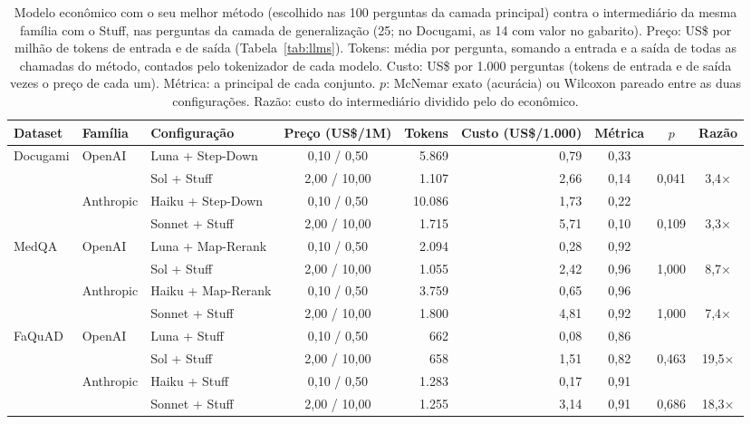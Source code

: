 \begin{table}[!t]
\centering
\footnotesize
\setlength{\tabcolsep}{4pt}
\caption{Modelo econômico com o seu melhor método (escolhido nas 100 perguntas da camada principal) contra o intermediário da mesma família com o Stuff, nas perguntas da camada de generalização (25; no Docugami, as 14 com valor no gabarito). Preço: US\$ por milhão de tokens de entrada e de saída (Tabela~\ref{tab:llms}). Tokens: média por pergunta, somando a entrada e a saída de todas as chamadas do método, contados pelo tokenizador de cada modelo. Custo: US\$ por 1.000 perguntas (tokens de entrada e de saída vezes o preço de cada um). Métrica: a principal de cada conjunto. $p$: McNemar exato (acurácia) ou Wilcoxon pareado entre as duas configurações. Razão: custo do intermediário dividido pelo do econômico.}
\label{tab:porte}
\begin{tabular}{lllcrrccc}
\toprule
Dataset & Família & Configuração & Preço (US\$/1M) & Tokens & Custo (US\$/1.000) & Métrica & $p$ & Razão \\
\midrule
Docugami & OpenAI & Luna + Step-Down & 0,10 / 0,50 & 5.869 & 0,79 & 0,33 &  &  \\
 &  & Sol + Stuff & 2,00 / 10,00 & 1.107 & 2,66 & 0,14 & 0,041 & 3,4× \\
\addlinespace
 & Anthropic & Haiku + Step-Down & 0,10 / 0,50 & 10.086 & 1,73 & 0,22 &  &  \\
 &  & Sonnet + Stuff & 2,00 / 10,00 & 1.715 & 5,71 & 0,10 & 0,109 & 3,3× \\
\midrule
MedQA & OpenAI & Luna + Map-Rerank & 0,10 / 0,50 & 2.094 & 0,28 & 0,92 &  &  \\
 &  & Sol + Stuff & 2,00 / 10,00 & 1.055 & 2,42 & 0,96 & 1,000 & 8,7× \\
\addlinespace
 & Anthropic & Haiku + Map-Rerank & 0,10 / 0,50 & 3.759 & 0,65 & 0,96 &  &  \\
 &  & Sonnet + Stuff & 2,00 / 10,00 & 1.800 & 4,81 & 0,92 & 1,000 & 7,4× \\
\midrule
FaQuAD & OpenAI & Luna + Stuff & 0,10 / 0,50 & 662 & 0,08 & 0,86 &  &  \\
 &  & Sol + Stuff & 2,00 / 10,00 & 658 & 1,51 & 0,82 & 0,463 & 19,5× \\
\addlinespace
 & Anthropic & Haiku + Stuff & 0,10 / 0,50 & 1.283 & 0,17 & 0,91 &  &  \\
 &  & Sonnet + Stuff & 2,00 / 10,00 & 1.255 & 3,14 & 0,91 & 0,686 & 18,3× \\
\bottomrule
\end{tabular}
\end{table}
